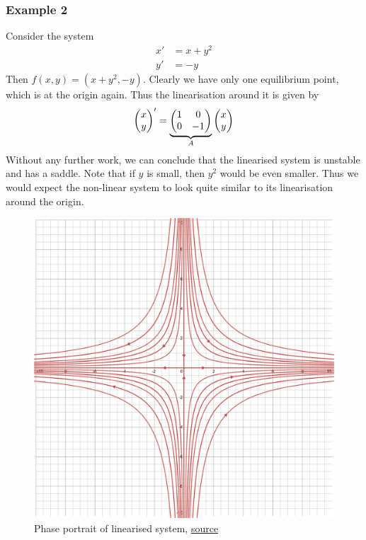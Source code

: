 \subsubsection{Example 2}
Consider the system
\begin{align*}
    x' &= x + y^2\\
    y' &= -y
\end{align*}
Then $f(x, y) = (x + y^2, -y)$. Clearly we have only one equilibrium point, which is at the origin again. Thus the linearisation around it is given by
$$ \begin{pmatrix} x\\y \end{pmatrix}' = \underbrace{\begin{pmatrix} 1 & 0\\0 & -1 \end{pmatrix}}_A \begin{pmatrix} x\\y \end{pmatrix} $$
Without any further work, we can conclude that the linearised system is unstable and has a saddle. Note that if $y$ is small, then $y^2$ would be even smaller. Thus we would expect the non-linear system to look quite similar to its linearisation around the origin.

\begin{figure}[ht]
    \centering
    \includegraphics[scale=0.17]{Images/linearisation_eg1.png}
    \caption{Phase portrait of linearised system, \href{https://www.desmos.com/calculator/jqmz5jddc4}{source}}
    \label{fig:linearisation-eg1}
\end{figure}

